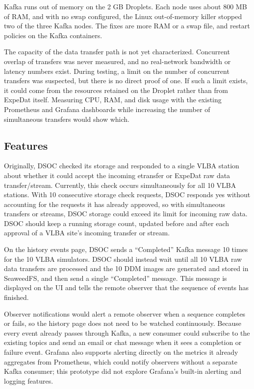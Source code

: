 \documentclass[12pt]{article}
\begin{document}
  Kafka runs out of memory on the 2 GB Droplets. Each node uses about 800 MB of RAM, and with no swap configured, the Linux out-of-memory killer stopped two of the three Kafka nodes. The fixes are more RAM or a swap file, and restart policies on the Kafka containers.

  The capacity of the data transfer path is not yet characterized. Concurrent overlap of transfers was never measured, and no real-network bandwidth or latency numbers exist. During testing, a limit on the number of concurrent transfers was suspected, but there is no direct proof of one. If such a limit exists, it could come from the resources retained on the Droplet rather than from ExpeDat itself. Measuring CPU, RAM, and disk usage with the existing Prometheus and Grafana dashboards while increasing the number of simultaneous transfers would show which.

\subsection*{Features}

  Originally, DSOC checked its storage and responded to a single VLBA station about whether it could accept the incoming etransfer or ExpeDat raw data transfer/stream. Currently, this check occurs simultaneously for all 10 VLBA stations. With 10 consecutive storage check requests, DSOC responds yes without accounting for the requests it has already approved, so with simultaneous transfers or streams, DSOC storage could exceed its limit for incoming raw data. DSOC should keep a running storage count, updated before and after each approval of a VLBA site's incoming transfer or stream.

  On the history events page, DSOC sends a ``Completed'' Kafka message 10 times for the 10 VLBA simulators. DSOC should instead wait until all 10 VLBA raw data transfers are processed and the 10 DDM images are generated and stored in SeaweedFS, and then send a single ``Completed'' message. This message is displayed on the UI and tells the remote observer that the sequence of events has finished.

  Observer notifications would alert a remote observer when a sequence completes or fails, so the history page does not need to be watched continuously. Because every event already passes through Kafka, a new consumer could subscribe to the existing topics and send an email or chat message when it sees a completion or failure event. Grafana also supports alerting directly on the metrics it already aggregates from Prometheus, which could notify observers without a separate Kafka consumer; this prototype did not explore Grafana's built-in alerting and logging features. 
\end{document}
